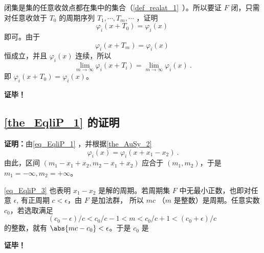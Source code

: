 闭集是集的任意收敛点都在集中的集合（\autoref{def_realat_1}~）。所以要证 $F$ 闭，只需对任意收敛于 $T_0$ 的周期序列 $T_1,\cdots, T_m,\cdots$ ，证明
\begin{equation}
\varphi_i(x+T_0)=\varphi_i(x)~
\end{equation}
即可。由于
\begin{equation}
\varphi_i(x+T_m)=\varphi_i(x)~
\end{equation}
恒成立，并且 $\varphi_i(x)$ 连续，所以
\begin{equation}
\lim_{m\rightarrow\infty}\varphi_i(x+T_i)=\lim_{m\rightarrow\infty}\varphi_i(x)~.
\end{equation}
即 $\varphi_i(x+T_0)=\varphi_i(x)$。

\textbf{证毕！}

\subsection{\autoref{the_EqliP_1} 的证明}

\textbf{证明：}由\autoref{eq_EqliP_1} ，并根据\autoref{the_AuSy_2}~
\begin{equation}\label{eq_EqliP_3}
\varphi_i(x)=\varphi_i(x+x_1-x_2)~.
\end{equation}
由此，区间 $(m_1-x_1+x_2,m_2-x_1+x_2)$ 应合于 $(m_1,m_2)$，于是 $m_1=-\infty,m_2=+\infty$。

\autoref{eq_EqliP_3} 也表明 $x_1-x_2$ 是解的周期。若周期集 $F$ 中无最小正数，也即对任意 $\epsilon$, 有正周期 $c<\epsilon$，由 $F$ 是加法群， 所以 $mc$ （$m$ 是整数）是周期。任意实数 $c_0$，若选取满足
\begin{equation}
(c_0-\epsilon)/c<c_0/c-1<m<c_0/c+1<(c_0+\epsilon)/c~
\end{equation}
的整数，就有 $\abs{mc-c_0}<\epsilon$。于是 $c_0$ 是


\textbf{证毕！}












